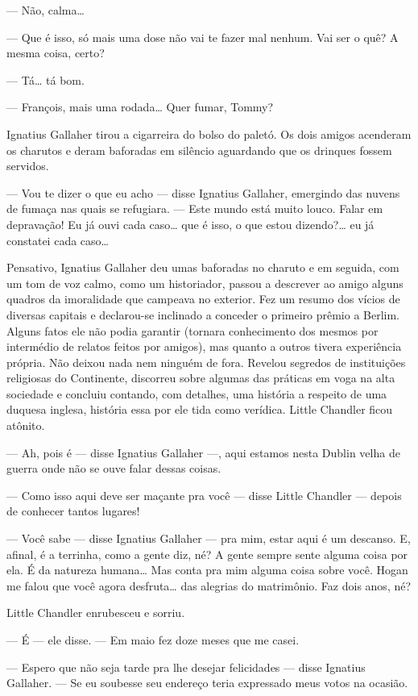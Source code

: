 --- Não, calma\ldots{}

--- Que é isso, só mais uma dose não vai te fazer mal nenhum. Vai ser
o quê? A mesma coisa, certo?

--- Tá\ldots{} tá bom.

--- François, mais uma rodada\ldots{} Quer fumar, Tommy?

Ignatius Gallaher tirou a cigarreira do bolso do paletó. Os dois
amigos acenderam os charutos e deram baforadas em silêncio aguardando
que os drinques fossem servidos.

--- Vou te dizer o que eu acho --- disse Ignatius Gallaher,
emergindo das nuvens de fumaça nas quais se refugiara. --- Este
mundo está muito louco. Falar em depravação! Eu já ouvi cada caso\ldots{}
que é isso, o que estou dizendo?\ldots{} eu já constatei cada caso\ldots{}

Pensativo, Ignatius Gallaher deu umas baforadas no charuto e em
seguida, com um tom de voz calmo, como um historiador, passou a
descrever ao amigo alguns quadros da imoralidade que campeava no
exterior. Fez um resumo dos vícios de diversas capitais e declarou-se
inclinado a conceder o primeiro prêmio a Berlim. Alguns fatos
ele não podia garantir (tornara conhecimento dos
mesmos por intermédio de relatos feitos por amigos), mas quanto a
outros tivera experiência própria. Não deixou nada nem ninguém de
fora. Revelou segredos de instituições religiosas do Continente,
discorreu sobre algumas das práticas em voga na alta sociedade e
concluiu contando, com detalhes, uma história a respeito de uma
duquesa inglesa, história essa por ele tida como verídica. Little
Chandler ficou atônito.

--- Ah, pois é --- disse Ignatius Gallaher ---, aqui estamos nesta
Dublin velha de guerra onde não se ouve falar dessas coisas.

--- Como isso aqui deve ser maçante pra você --- disse Little Chandler
--- depois de conhecer tantos lugares!

--- Você sabe --- disse Ignatius Gallaher --- pra mim, estar aqui
é um descanso. E, afinal, é a terrinha, como a gente diz, né? A gente
sempre sente alguma coisa por ela. É da natureza humana\ldots{} Mas conta
pra mim alguma coisa sobre você. Hogan me falou que você agora
desfruta\ldots{} das alegrias do matrimônio. Faz dois anos, né?

Little Chandler enrubesceu e sorriu.

--- É --- ele disse. --- Em maio fez doze meses que me casei.

--- Espero que não seja tarde pra lhe desejar felicidades --- disse
Ignatius Gallaher. --- Se eu soubesse seu endereço teria expressado
meus votos na ocasião.

